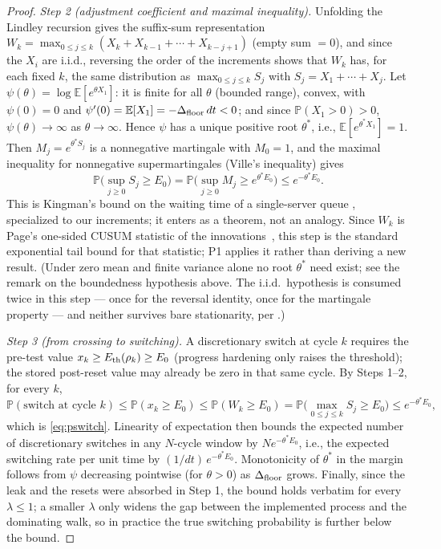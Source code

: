 \begin{proof}
\emph{Step 2 (adjustment coefficient and maximal inequality).} Unfolding the Lindley recursion gives the suffix-sum representation $W_k = \max_{0 \le j \le k} (X_k + X_{k-1} + \cdots + X_{k-j+1})$ (empty sum $= 0$), and since the $X_i$ are i.i.d., reversing the order of the increments shows that $W_k$ has, for each fixed $k$, the same distribution as $\max_{0 \le j \le k} S_j$ with $S_j = X_1 + \cdots + X_j$. Let $\psi(\theta) = \log \mathbb{E}[e^{\theta X_1}]$: it is finite for all $\theta$ (bounded range), convex, with $\psi(0) = 0$ and $\psi'(0) = \mathbb{E}[X_1] = -\Delta_{\text{floor}}\,dt < 0$; and since $\mathbb{P}(X_1 > 0) > 0$, $\psi(\theta) \to \infty$ as $\theta \to \infty$. Hence $\psi$ has a unique positive root $\theta^*$, i.e., $\mathbb{E}[e^{\theta^* X_1}] = 1$. Then $M_j = e^{\theta^* S_j}$ is a nonnegative martingale with $M_0 = 1$, and the maximal inequality for nonnegative supermartingales (Ville's inequality) gives
\[
\mathbb{P}\Big(\sup_{j \ge 0} S_j \ge E_0\Big) = \mathbb{P}\Big(\sup_{j \ge 0} M_j \ge e^{\theta^* E_0}\Big) \le e^{-\theta^* E_0}.
\]
This is Kingman's bound on the waiting time of a single-server queue \citep{kingman1970queues}, specialized to our increments; it enters as a theorem, not an analogy. Since $W_k$ is Page's one-sided CUSUM statistic of the innovations~\citep{page1954cusum}, this step is the standard exponential tail bound for that statistic; P1 applies it rather than deriving a new result. (Under zero mean and finite variance alone no root $\theta^*$ need exist; see the remark on the boundedness hypothesis above. The i.i.d.\ hypothesis is consumed twice in this step --- once for the reversal identity, once for the martingale property --- and neither survives bare stationarity, per .)

\emph{Step 3 (from crossing to switching).} A discretionary switch at cycle $k$ requires the pre-test value $x_k \ge E_{\text{th}}(\rho_k) \ge E_0$ (progress hardening only raises the threshold); the stored post-reset value may already be zero in that same cycle. By Steps 1--2, for every $k$,
\[
\mathbb{P}(\text{switch at cycle } k) \le \mathbb{P}(x_k \ge E_0) \le \mathbb{P}(W_k \ge E_0) = \mathbb{P}\Big(\max_{0 \le j \le k} S_j \ge E_0\Big) \le e^{-\theta^* E_0},
\]
which is \eqref{eq:pswitch}. Linearity of expectation then bounds the expected number of discretionary switches in any $N$-cycle window by $N e^{-\theta^* E_0}$, i.e., the expected switching rate per unit time by $(1/dt)\, e^{-\theta^* E_0}$. Monotonicity of $\theta^*$ in the margin follows from $\psi$ decreasing pointwise (for $\theta > 0$) as $\Delta_{\text{floor}}$ grows. Finally, since the leak and the resets were absorbed in Step 1, the bound holds verbatim for every $\lambda \le 1$; a smaller $\lambda$ only widens the gap between the implemented process and the dominating walk, so in practice the true switching probability is further below the bound.


\end{proof}
